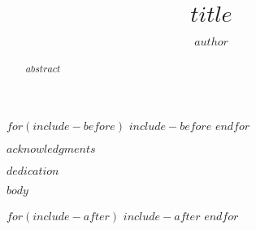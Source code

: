 \documentclass[$if(font-size)$$font-size$$else$10$endif$pt]{harvardthesis}
\title{$title$}
\author{$author$}
\begin{document}
\setlength{\abovedisplayskip}{6pt}
\setlength{\belowdisplayskip}{6pt}
\setlength{\abovedisplayshortskip}{6pt}
\setlength{\belowdisplayshortskip}{6pt}

$for(include-before)$
$include-before$
$endfor$


\thesistitlepage
\copyrightpage
\begin{abstract}
$abstract$
\end{abstract}

\renewcommand{\contentsname}{\protect\centering\protect\Large Contents}
\renewcommand{\listtablename}{\protect\centering\protect\Large List of Tables}
\renewcommand{\listfigurename}{\protect\centering\protect\Large List of Figures}

\tableofcontents %

\listoftables
\listoffigures
\begin{acknowledgments}
  $acknowledgments$
\end{acknowledgments}
\begin{dedication}
  $dedication$
\end{dedication}




$body$

$for(include-after)$
$include-after$
$endfor$
\end{document}
